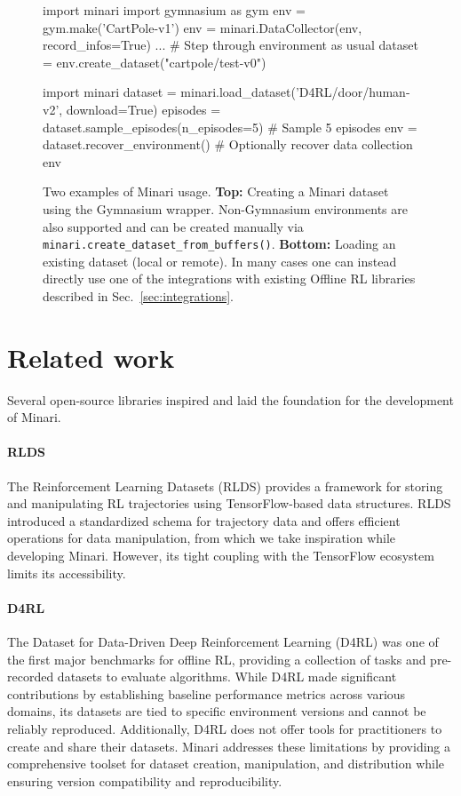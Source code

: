 \documentclass{article}
\begin{document}
\begin{figure}[t]
    \centering
   \begin{pythonsmall}
  import minari
  import gymnasium as gym
  env = gym.make('CartPole-v1')
  env = minari.DataCollector(env, record_infos=True)
  ... # Step through environment as usual
  dataset = env.create_dataset("cartpole/test-v0")\end{pythonsmall}
   \begin{pythonsmall}
  import minari
  dataset = minari.load_dataset('D4RL/door/human-v2', download=True)
  episodes = dataset.sample_episodes(n_episodes=5) # Sample 5 episodes
  env = dataset.recover_environment() # Optionally recover data collection env\end{pythonsmall}
  \caption{Two examples of Minari usage. \textbf{Top:} Creating a Minari dataset using the Gymnasium wrapper. Non-Gymnasium environments are also supported and can be created manually via \lstinline|minari.create_dataset_from_buffers()|. \textbf{Bottom:} Loading an existing dataset (local or remote). In many cases one can instead directly use one of the integrations with existing Offline RL  libraries described in Sec.~\ref{sec:integrations}.}
    \label{fig:code}
\end{figure}

\section{Related work}
Several open-source libraries inspired and laid the foundation for the development of Minari.

\paragraph{RLDS} The Reinforcement Learning Datasets (RLDS) \cite{rlds} provides a framework for storing and manipulating RL trajectories using TensorFlow-based data structures. RLDS introduced a standardized schema for trajectory data and offers efficient operations for data manipulation, from which we take inspiration while developing Minari. However, its tight coupling with the TensorFlow ecosystem limits its accessibility.

\paragraph{D4RL} The Dataset for Data-Driven Deep Reinforcement Learning (D4RL) \cite{d4rl} was one of the first major benchmarks for offline RL, providing a collection of tasks and pre-recorded datasets to evaluate algorithms. While D4RL made significant contributions by establishing baseline performance metrics across various domains, its datasets are tied to specific environment versions and cannot be reliably reproduced. Additionally, D4RL does not offer tools for practitioners to create and share their datasets. Minari addresses these limitations by providing a comprehensive toolset for dataset creation, manipulation, and distribution while ensuring version compatibility and reproducibility.
\end{document}
